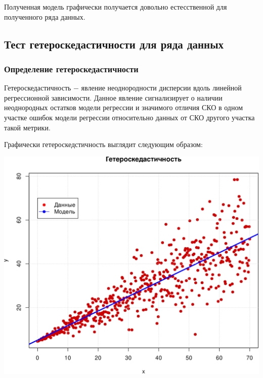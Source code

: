 \documentclass[
]{article}
\begin{document}
Полученная модель графически получается довольно естесственной для
полученного ряда данных.

\hypertarget{ux442ux435ux441ux442-ux433ux435ux442ux435ux440ux43eux441ux43aux435ux434ux430ux441ux442ux438ux447ux43dux43eux441ux442ux438-ux434ux43bux44f-ux440ux44fux434ux430-ux434ux430ux43dux43dux44bux445}{%
\subsection{\texorpdfstring{\textbf{Тест гетероскедастичности для ряда
данных}}{Тест гетероскедастичности для ряда данных}}\label{ux442ux435ux441ux442-ux433ux435ux442ux435ux440ux43eux441ux43aux435ux434ux430ux441ux442ux438ux447ux43dux43eux441ux442ux438-ux434ux43bux44f-ux440ux44fux434ux430-ux434ux430ux43dux43dux44bux445}}

\hypertarget{ux43eux43fux440ux435ux434ux435ux43bux435ux43dux438ux435-ux433ux435ux442ux435ux440ux43eux441ux43aux435ux434ux430ux441ux442ux438ux447ux43dux43eux441ux442ux438}{%
\subsubsection{\texorpdfstring{\textbf{Определение
гетероскедастичности}}{Определение гетероскедастичности}}\label{ux43eux43fux440ux435ux434ux435ux43bux435ux43dux438ux435-ux433ux435ux442ux435ux440ux43eux441ux43aux435ux434ux430ux441ux442ux438ux447ux43dux43eux441ux442ux438}}

Гетероскедастичность \(-\) явление неоднородности дисперсии вдоль
линейной регрессионной зависимости. Данное явление сигнализирует о
наличии неоднородных остатков модели регрессии и значимого отличия СКО в
одном участке ошибок модели регрессии относительно данных от СКО другого
участка такой метрики.

Графически гетероскедстичность выглядит следующим образом:

\begin{center}\includegraphics[width=0.6\linewidth]{Prac5_files/figure-latex/unnamed-chunk-16-1} \end{center}
\end{document}

